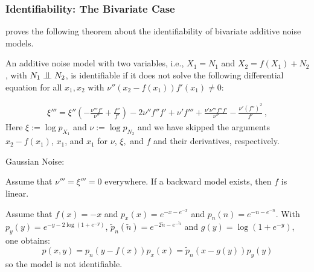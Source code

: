 \documentclass{beamer}
\newcommand{\bigCI}{\mathrel{\text{\scalebox{1.07}{$\perp\mkern-10mu\perp$}}}}
\begin{document}
\begin{frame}
\frametitle{Identifiability: The Bivariate Case}
 \cite{hoyer} proves the following theorem about the identifiability of  bivariate additive noise models.
\begin{theorem}
\begin{small}
An additive noise model with two variables, i.e., $X_1 = N_1$ and $X_2 = f(X_1) + N_2$, with $N_1 \bigCI N_2$, is identifiable if it does not solve the following differential equation for all $x_1,x_2$ with $\nu''(x_2-f(x_1))f'(x_1)\neq 0$:

\begin{equation*}
\begin{split}
\xi'''=   \xi''  \left(-\frac{\nu'''f'}{\nu''}
+\frac{f''}{f'}\right) 
-2 \nu''f''f' %
+\nu'f'''+\frac{\nu'\nu'''f''f'}{\nu''}-\frac{\nu'(f'')^2}{f'}\,,
\end{split}
\end{equation*}
Here $\xi:=\log p_{X_1}$ and $\nu:=\log p_{N_2}$ and we have skipped the arguments $x_2-f(x_1)$, $x_1$, and $x_1$  for $\nu$, $\xi,$ and $f$ and their derivatives, respectively.
\end{small}
\end{theorem}\end{frame}

\begin{frame}
\begin{corollary}{Gaussian Noise:}
\begin{small}
Assume that $\nu'''= \xi''' = 0$ everywhere. If a backward model exists, then $f$ is linear.
\end{small}
\end{corollary}
\begin{corollary}
\begin{small}
Assume that $f(x) = −x$ and $p_x(x) = e^{-x-e^{-x}}$ and $p_n(n) = e^{-n-e^{-n}}$.
With $p_y(y) = e^{-y-2 \log(1 + e^{−y})}$, $\tilde{p}_n(\tilde{n}) = e^{-2\tilde{n}-e^{-\tilde{n}}}$ and $g(y) = \log(1+e^{-y})$, one obtains:
$$p(x,y) =p_n(y-f(x))p_x(x) =\tilde{p}_n(x-g(y))p_y(y)$$
so the model is not identifiable.
\end{small}
\end{corollary}
\end{frame}
\end{document}
